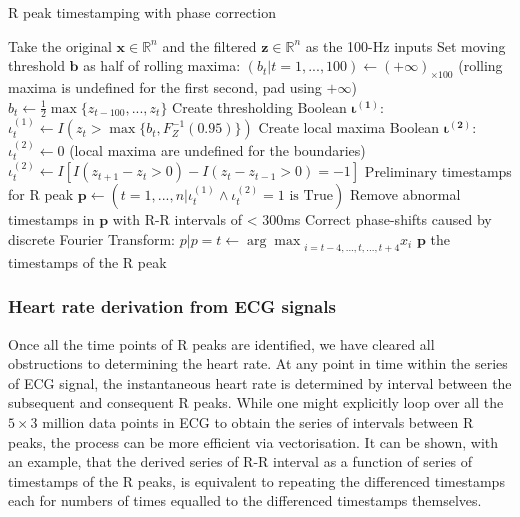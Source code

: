 \documentclass[
]{article}
\begin{document}
\begin{algorithm}
\caption{R peak timestamping with phase correction}
\begin{algorithmic}[1]
\STATE Take the original $\mathbf{x} \in \mathbb{R}^n$ and the filtered $\mathbf{z} \in \mathbb{R}^n$ as the 100-Hz inputs
\STATE Set moving threshold $\mathbf{b}$ as half of rolling maxima:
\STATE $(b_t | t = 1, ..., 100) \leftarrow (+\infty)_{\times 100}$ (rolling maxima is undefined for the first second, pad using $+\infty$)
\STATE $b_t \leftarrow \frac{1}{2}\max\{z_{t - 100}, ..., z_t\}$
\ENDFOR
\STATE Create thresholding Boolean $\boldsymbol{\iota^{(1)}}$:
\STATE $\iota^{(1)}_t \leftarrow I(z_t > \max\{b_t, F^{-1}_{Z}(0.95)\})$
\ENDFOR
\STATE Create local maxima Boolean $\boldsymbol{\iota^{(2)}}$:
\STATE $\iota^{(2)}_t \leftarrow 0$ (local maxima are undefined for the boundaries)
\ENDFOR
{}
\STATE $\iota^{(2)}_t \leftarrow I[I(z_{t + 1} - z_t > 0) - I(z_t - z_{t - 1} > 0) = -1]$
\ENDFOR
\STATE Preliminary timestamps for R peak $\mathbf{p} \leftarrow (t = 1, ..., n | \iota^{(1)}_t \land \iota^{(2)}_t = 1 \text{ is True})$
\STATE Remove abnormal timestamps in $\mathbf{p}$ with R-R intervals of < 300ms
\STATE Correct phase-shifts caused by discrete Fourier Transform:
\STATE $p | p = t \leftarrow {\arg\max}_{i = t - 4, ..., t, ..., t + 4} x_i$
\ENDFOR
\RETURN $\mathbf{p}$ the timestamps of the R peak
\end{algorithmic}
\end{algorithm}

\newpage

\hypertarget{heart-rate-derivation-from-ecg-signals}{%
\subsubsection{Heart rate derivation from ECG
signals}\label{heart-rate-derivation-from-ecg-signals}}

Once all the time points of R peaks are identified, we have cleared all
obstructions to determining the heart rate. At any point in time within
the series of ECG signal, the instantaneous heart rate is determined by
interval between the subsequent and consequent R peaks. While one might
explicitly loop over all the \(5 \times 3\) million data points in ECG
to obtain the series of intervals between R peaks, the process can be
more efficient via vectorisation. It can be shown, with an example, that
the derived series of R-R interval as a function of series of timestamps
of the R peaks, is equivalent to repeating the differenced timestamps
each for numbers of times equalled to the differenced timestamps
themselves.
\end{document}
